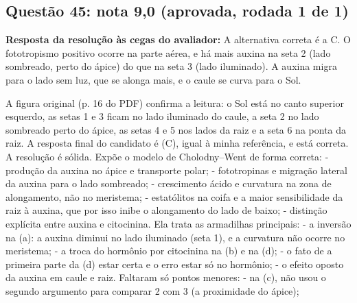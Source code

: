 \documentclass{article}%
\begin{document}
\subsection*{Questão 45: nota 9,0 (aprovada, rodada 1 de 1)}%
\textbf{Resposta da resolução às cegas do avaliador:} A alternativa correta é a C. O fototropismo positivo ocorre na parte aérea, e há mais auxina na seta 2 (lado sombreado, perto do ápice) do que na seta 3 (lado iluminado). A auxina migra para o lado sem luz, que se alonga mais, e o caule se curva para o Sol.\par %
A figura original (p. 16 do PDF) confirma a leitura: o Sol está no canto superior esquerdo, as setas 1 e 3 ficam no lado iluminado do caule, a seta 2 no lado sombreado perto do ápice, as setas 4 e 5 nos lados da raiz e a seta 6 na ponta da raiz. A resposta final do candidato é (C), igual à minha referência, e está correta.\newline%
\newline%
A resolução é sólida. Expõe o modelo de Cholodny--Went de forma correta:\newline%
{-} produção da auxina no ápice e transporte polar;\newline%
{-} fototropinas e migração lateral da auxina para o lado sombreado;\newline%
{-} crescimento ácido e curvatura na zona de alongamento, não no meristema;\newline%
{-} estatólitos na coifa e a maior sensibilidade da raiz à auxina, que por isso inibe o alongamento do lado de baixo;\newline%
{-} distinção explícita entre auxina e citocinina.\newline%
\newline%
Ela trata as armadilhas principais:\newline%
{-} a inversão na (a): a auxina diminui no lado iluminado (seta 1), e a curvatura não ocorre no meristema;\newline%
{-} a troca do hormônio por citocinina na (b) e na (d);\newline%
{-} o fato de a primeira parte da (d) estar certa e o erro estar só no hormônio;\newline%
{-} o efeito oposto da auxina em caule e raiz.\newline%
\newline%
Faltaram só pontos menores:\newline%
{-} na (c), não usou o segundo argumento para comparar 2 com 3 (a proximidade do ápice);\newline%
\end{document}
